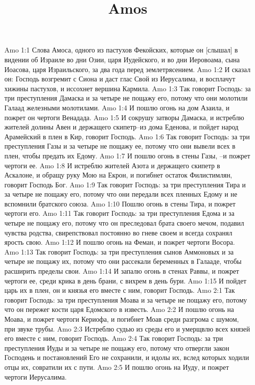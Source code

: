 

\title{Amos}

Amo 1:1  Слова Амоса, одного из пастухов Фекойских, которые он [слышал] в видении об Израиле во дни Озии, царя Иудейского, и во дни Иеровоама, сына Иоасова, царя Израильского, за два года перед землетрясением.
Amo 1:2  И сказал он: Господь возгремит с Сиона и даст глас Свой из Иерусалима, и восплачут хижины пастухов, и иссохнет вершина Кармила.
Amo 1:3  Так говорит Господь: за три преступления Дамаска и за четыре не пощажу его, потому что они молотили Галаад железными молотилами.
Amo 1:4  И пошлю огонь на дом Азаила, и пожрет он чертоги Венадада.
Amo 1:5  И сокрушу затворы Дамаска, и истреблю жителей долины Авен и держащего скипетр--из дома Еденова, и пойдет народ Арамейский в плен в Кир, говорит Господь.
Amo 1:6  Так говорит Господь: за три преступления Газы и за четыре не пощажу ее, потому что они вывели всех в плен, чтобы предать их Едому.
Amo 1:7  И пошлю огонь в стены Газы, --и пожрет чертоги ее.
Amo 1:8  И истреблю жителей Азота и держащего скипетр в Аскалоне, и обращу руку Мою на Екрон, и погибнет остаток Филистимлян, говорит Господь Бог.
Amo 1:9  Так говорит Господь: за три преступления Тира и за четыре не пощажу его, потому что они передали всех пленных Едому и не вспомнили братского союза.
Amo 1:10  Пошлю огонь в стены Тира, и пожрет чертоги его.
Amo 1:11  Так говорит Господь: за три преступления Едома и за четыре не пощажу его, потому что он преследовал брата своего мечом, подавил чувства родства, свирепствовал постоянно во гневе своем и всегда сохранял ярость свою.
Amo 1:12  И пошлю огонь на Феман, и пожрет чертоги Восора.
Amo 1:13  Так говорит Господь: за три преступления сынов Аммоновых и за четыре не пощажу их, потому что они рассекали беременных в Галааде, чтобы расширить пределы свои.
Amo 1:14  И запалю огонь в стенах Раввы, и пожрет чертоги ее, среди крика в день брани, с вихрем в день бури.
Amo 1:15  И пойдет царь их в плен, он и князья его вместе с ним, говорит Господь.
Amo 2:1  Так говорит Господь: за три преступления Моава и за четыре не пощажу его, потому что он пережег кости царя Едомского в известь.
Amo 2:2  И пошлю огонь на Моава, и пожрет чертоги Кериофа, и погибнет Моав среди разгрома с шумом, при звуке трубы.
Amo 2:3  Истреблю судью из среды его и умерщвлю всех князей его вместе с ним, говорит Господь.
Amo 2:4  Так говорит Господь: за три преступления Иуды и за четыре не пощажу его, потому что отвергли закон Господень и постановлений Его не сохранили, и идолы их, вслед которых ходили отцы их, совратили их с пути.
Amo 2:5  И пошлю огонь на Иуду, и пожрет чертоги Иерусалима.

